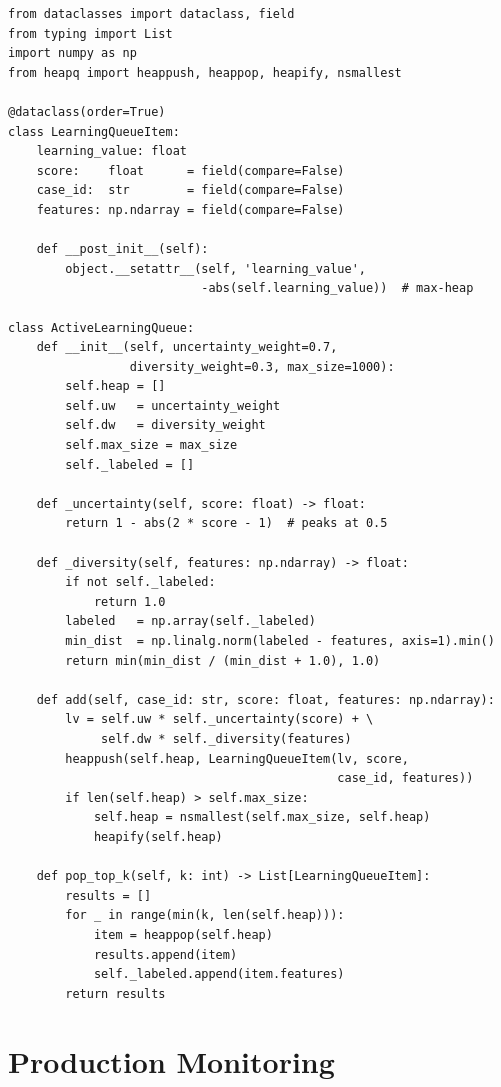 \begin{lstlisting}[style=python, caption={Active learning priority queue}]
from dataclasses import dataclass, field
from typing import List
import numpy as np
from heapq import heappush, heappop, heapify, nsmallest

@dataclass(order=True)
class LearningQueueItem:
    learning_value: float
    score:    float      = field(compare=False)
    case_id:  str        = field(compare=False)
    features: np.ndarray = field(compare=False)

    def __post_init__(self):
        object.__setattr__(self, 'learning_value',
                           -abs(self.learning_value))  # max-heap

class ActiveLearningQueue:
    def __init__(self, uncertainty_weight=0.7,
                 diversity_weight=0.3, max_size=1000):
        self.heap = []
        self.uw   = uncertainty_weight
        self.dw   = diversity_weight
        self.max_size = max_size
        self._labeled = []

    def _uncertainty(self, score: float) -> float:
        return 1 - abs(2 * score - 1)  # peaks at 0.5

    def _diversity(self, features: np.ndarray) -> float:
        if not self._labeled:
            return 1.0
        labeled   = np.array(self._labeled)
        min_dist  = np.linalg.norm(labeled - features, axis=1).min()
        return min(min_dist / (min_dist + 1.0), 1.0)

    def add(self, case_id: str, score: float, features: np.ndarray):
        lv = self.uw * self._uncertainty(score) + \
             self.dw * self._diversity(features)
        heappush(self.heap, LearningQueueItem(lv, score,
                                              case_id, features))
        if len(self.heap) > self.max_size:
            self.heap = nsmallest(self.max_size, self.heap)
            heapify(self.heap)

    def pop_top_k(self, k: int) -> List[LearningQueueItem]:
        results = []
        for _ in range(min(k, len(self.heap))):
            item = heappop(self.heap)
            results.append(item)
            self._labeled.append(item.features)
        return results
\end{lstlisting}

\section{Production Monitoring}

